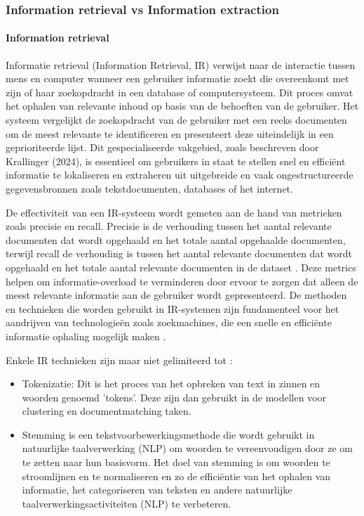 \subsubsection{Information retrieval vs Information extraction}
\paragraph{Information retrieval}
Informatie retrieval (Information Retrieval, IR) verwijst naar de interactie tussen mens en computer wanneer een gebruiker informatie zoekt die overeenkomt met zijn of haar zoekopdracht in een database of computersysteem. Dit proces omvat het ophalen van relevante inhoud op basis van de behoeften van de gebruiker. Het systeem vergelijkt de zoekopdracht van de gebruiker met een reeks documenten om de meest relevante te identificeren en presenteert deze uiteindelijk in een geprioriteerde lijst. Dit gespecialiseerde vakgebied, zoals beschreven door Krallinger (2024), is essentieel om gebruikers in staat te stellen snel en efficiënt informatie te lokaliseren en extraheren uit uitgebreide en vaak ongestructureerde gegevensbronnen zoals tekstdocumenten, databases of het internet.

De effectiviteit van een IR-systeem wordt gemeten aan de hand van metrieken zoals precisie en recall. Precisie is de verhouding tussen het aantal relevante documenten dat wordt opgehaald en het totale aantal opgehaalde documenten, terwijl recall de verhouding is tussen het aantal relevante documenten dat wordt opgehaald en het totale aantal relevante documenten in de dataset \autocite{Javija2024}. Deze metrics helpen om informatie-overload te verminderen door ervoor te zorgen dat alleen de meest relevante informatie aan de gebruiker wordt gepresenteerd. De methoden en technieken die worden gebruikt in IR-systemen zijn fundamenteel voor het aandrijven van technologieën zoals zoekmachines, die een snelle en efficiënte informatie ophaling mogelijk maken \autocite{Krallinger2024}.

Enkele IR technieken zijn maar niet gelimiteerd tot \autocite{IBM2024}:
\begin{itemize}
  \item Tokenizatie: Dit is het proces van het opbreken van text in zinnen en woorden genoemd 'tokens'. Deze zijn dan gebruikt in de modellen voor clustering en documentmatching taken\autocite{IBM2024}.
  \item Stemming is een tekstvoorbewerkingsmethode die wordt gebruikt in natuurlijke taalverwerking (NLP) om woorden te vereenvoudigen door ze om te zetten naar hun basisvorm. Het doel van stemming is om woorden te stroomlijnen en te normaliseren en zo de efficiëntie van het ophalen van informatie, het categoriseren van teksten en andere natuurlijke taalverwerkingsactiviteiten (NLP) te verbeteren\autocite{SC2024}.
\end{itemize}

